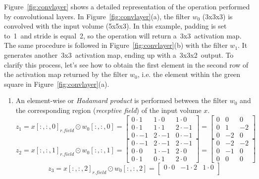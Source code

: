 \begin{description}
	Figure~\ref{fig:convlayer} shows a detailed representation of the operation performed by convolutional layers. In Figure~\ref{fig:convlayer}(a), the filter $w_0$ (3x3x3) is convolved with the input volume (5x5x3). In this example, padding is set to~1~and stride is equal~2, so the operation will return a~3x3~activation map. The same procedure is followed in Figure~\ref{fig:convlayer}(b) with the filter $w_1$. It generates another~3x3~activation map, ending up with a~3x3x2~output. To clarify this process, let's see how to obtain the first element in the second row of the activation map returned by the filter $w_0$, i.e. the element within the green square in Figure~\ref{fig:convlayer}(a).
	\begin{enumerate}
		\item An element-wise or \emph{Hadamard product} is performed between the filter $w_0$ and the corresponding region (\emph{receptive field}) of the input volume $x$.
		\begin{equation}
		z_1=x[:,:,0]_{r. field}\odot{w_0[:,:,0]} = 
		\begin{bmatrix}
		0\cdot 1 & 1\cdot 0 & 1\cdot 0\\
		0\cdot 1 & 1\cdot 1 & 2\cdot -1\\
		0\cdot -1 & 2\cdot -1 & 0\cdot -1
		\end{bmatrix}=
		\begin{bmatrix}
		0 & 0 & 0\\
		0 & 1 & -2\\
		0 & -2 & 0
		\end{bmatrix}
		\end{equation}
		\begin{equation}
		z_2=x[:,:,1]_{r. field}\odot{w_0[:,:,1]} = 
		\begin{bmatrix}
		0\cdot -1 & 2\cdot -1 & 2\cdot -1\\
		0\cdot 0 & 1\cdot -1 & 2\cdot 0\\
		0\cdot 1 & 0\cdot 1 & 2\cdot 0
		\end{bmatrix}=
		\begin{bmatrix}
		0 & -2 & -2\\
		0 & -1 & 0\\
		0 & 0 & 0
		\end{bmatrix}
		\end{equation}
		\begin{equation}
		z_3=x[:,:,2]_{r. field}\odot{w_0[:,:,2]} = 
		\begin{bmatrix}
		0\cdot 0 & -1\cdot 2 & 1\cdot 0\\

\end{bmatrix}
\end{equation}
\end{enumerate}
\end{description}
